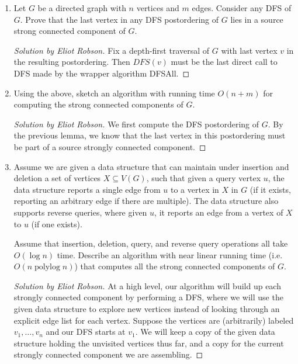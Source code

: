 \documentclass{article}
\newenvironment{solution}[1]{\begin{proof}[Solution by #1]}{\end{proof}}
\DeclareMathOperator*{\polylog}{polylog}
\begin{document}
\begin{enumerate}
    \item Let \(G\) be a directed graph with \(n\) vertices and \(m\) edges. Consider any DFS of \(G\). Prove that the last vertex in any DFS postordering of \(G\) lies in a source strong connected component of \(G\).
    
    \begin{solution}{Eliot Robson}
        Fix a depth-first traversal of \(G\) with last vertex \(v\) in the resulting postordering. Then \(DFS(v)\) must be the last direct call to DFS made by the wrapper algorithm DFSAll.
    \end{solution}

    \item Using the above, sketch an algorithm with running time \(O(n + m)\) for computing the strong connected components of \(G\).
    
    \begin{solution}{Eliot Robson}
        We first compute the DFS postordering of \(G\). By the previous lemma, we know that the last vertex in this postordering must be part of a source strongly connected component. 
    \end{solution}

    \item Assume we are given a data structure that can maintain under insertion and deletion a set of vertices \(X \subseteq V(G)\), such that given a query vertex \(u\), the data structure reports a single edge from \(u\) to a vertex in \(X\) in \(G\) (if it exists, reporting an arbitrary edge if there are multiple). The data structure also supports reverse queries, where given \(u\), it reports an edge from a vertex of \(X\) to \(u\) (if one exists).
    
    Assume that insertion, deletion, query, and reverse query operations all take \(O(\log n)\) time. Describe an algorithm with near linear running time (i.e.\ \(O(n \polylog n)\)) that computes all the strong connected components of \(G\).
    
    \begin{solution}{Eliot Robson}
        At a high level, our algorithm will build up each strongly connected component by performing a DFS, where we will use the given data structure to explore new vertices instead of looking through an explicit edge list for each vertex. Suppose the vertices are (arbitrarily) labeled \(v_1, \dots, v_n\) and our DFS starts at \(v_1\). We will keep a copy of the given data structure holding the unvisited vertices thus far, and a copy for the current strongly connected component we are assembling.
        

\end{solution}
\end{enumerate}
\end{document}
